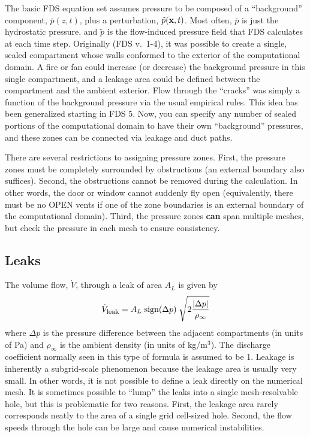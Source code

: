 \documentclass[11pt]{book}
\newcommand{\bx}{{\bf x}}
\newcommand{\tp}{\tilde{p}}
\newcommand{\bp}{\overline{p}}
\newcommand{\be}{\begin{equation}}
\newcommand{\ee}{\end{equation}}
\begin{document}
The basic FDS equation set assumes pressure
to be composed of a ``background'' component, $\bp(z,t)$, plus a perturbation, $\tp(\bx,t)$. Most
often, $\bp$ is just the hydrostatic pressure, and $\tp$ is the flow-induced pressure field that
FDS calculates at each time step. Originally (FDS v.~1-4), it was possible to create a single, sealed
compartment whose walls conformed to the exterior of the computational domain. A fire or fan could
increase (or decrease) the background pressure in this single compartment, and a leakage area could
be defined between the compartment and the ambient exterior. Flow through the ``cracks'' was simply
a function of the background pressure via the usual empirical rules.
This idea has been generalized starting in FDS 5. Now, you can specify any number of sealed portions of the computational
domain to have their own ``background'' pressures, and these zones can be connected via leakage and duct paths.

There are several restrictions to assigning pressure zones. First, the pressure zones must be completely surrounded by
obstructions (an external boundary also suffices).
Second, the obstructions cannot be removed during the calculation. In other words, the door or window cannot
suddenly fly open (equivalently, there must be no {\ct OPEN} vents if one of the zone boundaries
is an external boundary of the computational domain).
Third, the pressure zones {\bf can} span multiple meshes,
but check the pressure in each mesh to ensure consistency.


\subsection{Leaks}
\label{info:Leaks}

The volume flow, $\dot{V}$, through a leak of area $A_L$ is given by
\be  \dot{V}_{\hbox{\footnotesize leak}} = A_L \; \hbox{sign} (\Delta p) \; \sqrt{2 \frac{ | \Delta p |}{\rho_\infty}} \ee
where $\Delta p$ is the pressure difference between the adjacent compartments (in units of Pa) and
$\rho_\infty$ is the ambient density (in units of kg/m$^3$). The discharge coefficient normally seen in this type of formula is assumed
to be 1. Leakage is inherently a subgrid-scale phenomenon because the leakage area is usually very small. In other words, it is not possible to define a leak directly on the
numerical mesh. It is sometimes possible to ``lump'' the leaks into a single mesh-resolvable hole, but this is problematic
for two reasons. First, the leakage area rarely corresponds neatly to the area of a single grid cell-sized hole. Second, the
flow speeds through the hole can be large and cause numerical instabilities.
\end{document}
